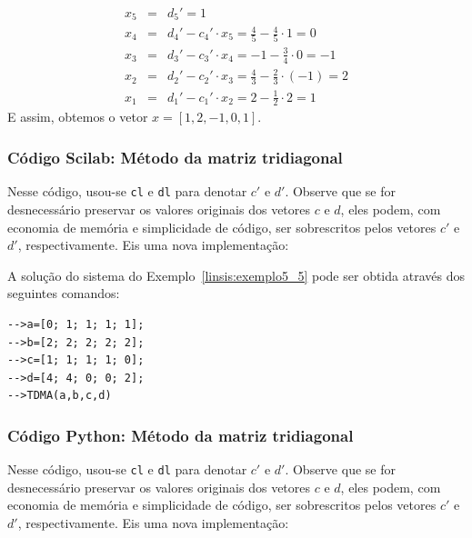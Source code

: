 \begin{ex}
\begin{eqnarray}
 x_5&=&d_5'=1\\
 x_4&=&d_4'-c_4'\cdot x_5=\frac{4}{5}-\frac{4}{5}\cdot 1 = 0\\
 x_3&=&d_3'-c_3'\cdot x_4=-1-\frac{3}{4}\cdot 0 = -1\\
 x_2&=&d_2'-c_2'\cdot x_3=\frac{4}{3}-\frac{2}{3}\cdot (-1) = 2\\
 x_1&=&d_1'-c_1'\cdot x_2=2-\frac{1}{2}\cdot 2 = 1
 \end{eqnarray}
E assim, obtemos o vetor $x=[1, 2, -1, 0, 1]$.
\end{ex}


\ifisscilab
\subsubsection{Código Scilab: Método da matriz tridiagonal}



Nesse código, usou-se \verb+cl+ e \verb+dl+ para denotar $c'$ e $d'$. Observe que se for desnecessário preservar os valores originais dos vetores $c$ e $d$, eles podem, com economia de memória e simplicidade de código, ser sobrescritos pelos vetores $c'$ e $d'$, respectivamente. Eis uma nova implementação:



A solução do sistema do Exemplo~\ref{linsis:exemplo5_5} pode ser obtida através dos seguintes comandos:
\begin{verbatim}
-->a=[0; 1; 1; 1; 1];
-->b=[2; 2; 2; 2; 2];
-->c=[1; 1; 1; 1; 0];
-->d=[4; 4; 0; 0; 2];
-->TDMA(a,b,c,d)
\end{verbatim}

\fi


\ifispython
\subsubsection{Código Python: Método da matriz tridiagonal}



Nesse código, usou-se \verb+cl+ e \verb+dl+ para denotar $c'$ e $d'$. Observe que se for desnecessário preservar os valores originais dos vetores $c$ e $d$, eles podem, com economia de memória e simplicidade de código, ser sobrescritos pelos vetores $c'$ e $d'$, respectivamente. Eis uma nova implementação:

